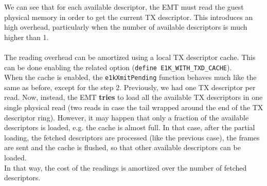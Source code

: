 \documentclass[a4paper, 12pt, titlepage]{report}
\begin{document}
We can see that for each available descriptor, the EMT must read the guest physical memory in order to get the current TX descriptor. This introduces an high overhead, particularly when the number of available descriptors is much higher than 1.
\\
\\
The reading overhead can be amortized using a local TX descriptor cache. This can be done enabling the related option (\texttt{define E1K\_WITH\_TXD\_CACHE}).
\\
When the cache is enabled, the \texttt{e1kXmitPending} function behaves much like the same as before, except for the step 2. Previously, we had one TX descriptor per read. Now, instead, the EMT \textbf{tries} to load all the available TX descriptors in one single physical read (two reads in case the tail wrapped around the end of the TX descriptor ring). However, it may happen that only a fraction of the available descriptors is loaded, e.g. the cache is almost full. In that case, after the partial loading, the fetched descriptors are processed (like the previous case), the frames are sent and the cache is flushed, so that other available descriptors can be loaded.
\\
In that way, the cost of the readings is amortized over the number of fetched descriptors.
\end{document}
